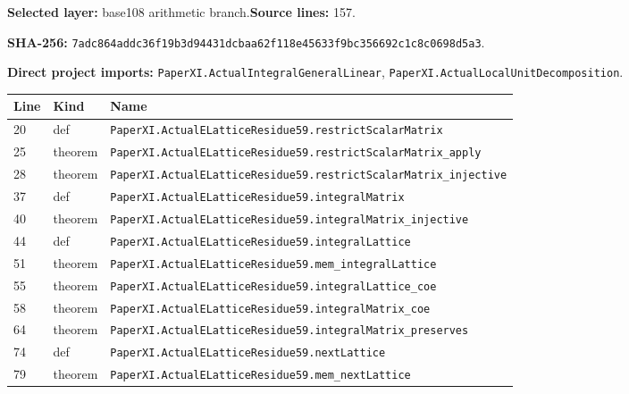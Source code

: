 \documentclass[10pt,oneside]{book}
\begin{document}
\textbf{Selected layer:} base108 arithmetic branch.\quad\textbf{Source lines:} 157.\par\textbf{SHA-256:} {\scriptsize\nolinkurl{7adc864addc36f19b3d94431dcbaa62f118e45633f9bc356692c1c8c0698d5a3}}.


\textbf{Direct project imports:} \nolinkurl{PaperXI.ActualIntegralGeneralLinear}, \nolinkurl{PaperXI.ActualLocalUnitDecomposition}.

\begin{longtable}{@{}p{}p{}p{}@{}}\toprule Line&Kind&Name\\\midrule\endhead

20&def&\nolinkurl{PaperXI.ActualELatticeResidue59.restrictScalarMatrix}\\

25&theorem&\nolinkurl{PaperXI.ActualELatticeResidue59.restrictScalarMatrix_apply}\\

28&theorem&\nolinkurl{PaperXI.ActualELatticeResidue59.restrictScalarMatrix_injective}\\

37&def&\nolinkurl{PaperXI.ActualELatticeResidue59.integralMatrix}\\

40&theorem&\nolinkurl{PaperXI.ActualELatticeResidue59.integralMatrix_injective}\\

44&def&\nolinkurl{PaperXI.ActualELatticeResidue59.integralLattice}\\

51&theorem&\nolinkurl{PaperXI.ActualELatticeResidue59.mem_integralLattice}\\

55&theorem&\nolinkurl{PaperXI.ActualELatticeResidue59.integralLattice_coe}\\

58&theorem&\nolinkurl{PaperXI.ActualELatticeResidue59.integralMatrix_coe}\\

64&theorem&\nolinkurl{PaperXI.ActualELatticeResidue59.integralMatrix_preserves}\\

74&def&\nolinkurl{PaperXI.ActualELatticeResidue59.nextLattice}\\

79&theorem&\nolinkurl{PaperXI.ActualELatticeResidue59.mem_nextLattice}\\


\end{longtable}
\end{document}
